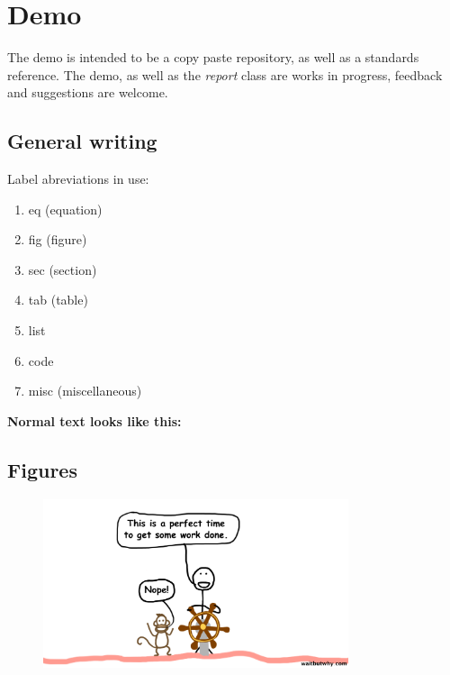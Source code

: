 \section{Demo} \label{sec:demo}

\large{The demo is intended to be a copy paste repository, as well as a standards reference. The demo, as well as the \textit{report} class are works in progress, feedback and suggestions are welcome.}

\subsection{General writing}



Label abreviations in use:
\begin{enumerate}[leftmargin=1.2 cm, label=Label \arabic*:] 
\itemsep1pt \parskip0pt  \label{list:labels}
	\item eq  (equation)
	\item fig (figure)
	\item sec (section)
	\item tab (table)
	\item list 
	\item code
	\item misc (miscellaneous)
\end{enumerate} %

\textbf{Normal text looks like this:}\\
\lipsum[2-3]


\subsection{Figures}
\begin{figure}[htbp!] %
	\centering
	\includegraphics[width=0.8\textwidth]{./appendix/xdemo_monkey.png}
	\caption{}
	\label{fig:monkey}
\end{figure}


